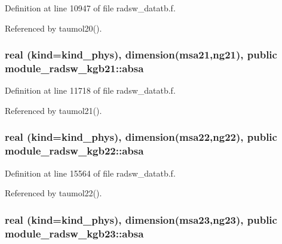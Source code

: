 Definition at line 10947 of file radsw\+\_\+datatb.\+f.



Referenced by taumol20().

\subsubsection[{\texorpdfstring{absa}{absa}}]{\setlength{\rightskip}{0pt plus 5cm}real (kind=kind\+\_\+phys), dimension(msa21,ng21), public module\+\_\+radsw\+\_\+kgb21\+::absa}\hypertarget{group__module__radsw__main_ga7cce83c282d3efec6a3fe319480c270a}{}\label{group__module__radsw__main_ga7cce83c282d3efec6a3fe319480c270a}


Definition at line 11718 of file radsw\+\_\+datatb.\+f.



Referenced by taumol21().

\subsubsection[{\texorpdfstring{absa}{absa}}]{\setlength{\rightskip}{0pt plus 5cm}real (kind=kind\+\_\+phys), dimension(msa22,ng22), public module\+\_\+radsw\+\_\+kgb22\+::absa}\hypertarget{group__module__radsw__main_ga15ed79e7136ed6d7f11c19a81281af53}{}\label{group__module__radsw__main_ga15ed79e7136ed6d7f11c19a81281af53}


Definition at line 15564 of file radsw\+\_\+datatb.\+f.



Referenced by taumol22().

\subsubsection[{\texorpdfstring{absa}{absa}}]{\setlength{\rightskip}{0pt plus 5cm}real (kind=kind\+\_\+phys), dimension(msa23,ng23), public module\+\_\+radsw\+\_\+kgb23\+::absa}\hypertarget{group__module__radsw__main_ga2541e41c7d445a2ce73283e2fb76270c}{}\label{group__module__radsw__main_ga2541e41c7d445a2ce73283e2fb76270c}


